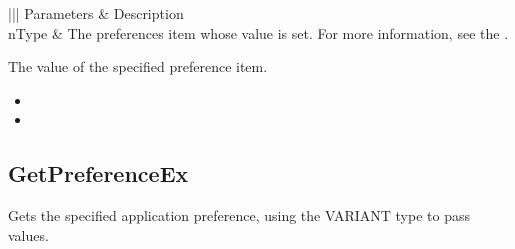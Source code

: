 \documentclass[letterpaper,12pt,english,openany,oneside]{sphinxmanual}
\begin{document}

\begin{sphinxVerbatim}[commandchars=\\\{\}]
  
\end{sphinxVerbatim}
\label{\detokenize{IAC_API_OLE_Objects:parameters-2}}


\begin{savenotes}\sphinxattablestart
\centering
{}\label{\detokenize{IAC_API_OLE_Objects:section-4}}\nobreak
\begin{tabular}[t]{|||}
\hline
\sphinxstyletheadfamily 
Parameters
&\sphinxstyletheadfamily 
Description
\\
\hline
nType
&
The preferences item whose value is set. For more information, see the  .
\\
\hline
\end{tabular}
\par
\sphinxattableend\end{savenotes}


The value of the specified preference item.

\label{\detokenize{IAC_API_OLE_Objects:related-methods-8}}
\begin{itemize}
\item {} 
 

\item {} 
 

\end{itemize}




\subsection{GetPreferenceEx}
\label{\detokenize{IAC_API_OLE_Objects:getpreferenceex}}
Gets the specified application preference, using the VARIANT type to pass values.


\begin{sphinxVerbatim}[commandchars=\\\{\}]
  
\end{sphinxVerbatim}
\label{\detokenize{IAC_API_OLE_Objects:parameters-3}}
\end{document}
